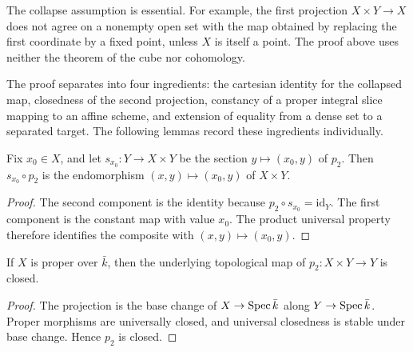 \begin{remark}
  \label{mk-rmk:rigidity_lemma_cube_free}
  The collapse assumption is essential.  For example, the first projection
  \(X\times Y\to X\) does not agree on a nonempty open set with the map obtained by
  replacing the first coordinate by a fixed point, unless \(X\) is itself a point.
  The proof above uses neither the theorem of the cube nor cohomology.
\end{remark}

\begin{remark}
  \label{mk-rmk:rigidity_lemma_decomposition}
  The proof separates into four ingredients: the cartesian identity for the collapsed
  map, closedness of the second projection, constancy of a proper integral slice mapping
  to an affine scheme, and extension of equality from a dense set to a separated target.
  The following lemmas record these ingredients individually.
\end{remark}

\begin{lemma}
  \label{mk-lem:rigidity_snd_lift}
  \leanok

  Fix \(x_0\in X\), and let \(s_{x_0}\colon Y\to X\times Y\) be the section
  \(y\mapsto(x_0,y)\) of \(p_2\).  Then \(s_{x_0}\circ p_2\) is the endomorphism
  \((x,y)\mapsto(x_0,y)\) of \(X\times Y\).
\end{lemma}
\begin{proof}
  \leanok
  The second component is the identity because \(p_2\circ s_{x_0}=\mathrm{id}_Y\).
  The first component is the constant map with value \(x_0\).  The product universal
  property therefore identifies the composite with \((x,y)\mapsto(x_0,y)\).
\end{proof}

\begin{lemma}
  \label{mk-lem:snd_left_isClosedMap}
  \leanok

  If \(X\) is proper over \(\bar k\), then the underlying topological map of
  \(p_2\colon X\times Y\to Y\) is closed.
\end{lemma}
\begin{proof}
  \leanok
  The projection is the base change of \(X\to\operatorname{Spec}\bar k\) along
  \(Y\to\operatorname{Spec}\bar k\).  Proper morphisms are universally closed, and universal
  closedness is stable under base change.  Hence \(p_2\) is closed.
\end{proof}

